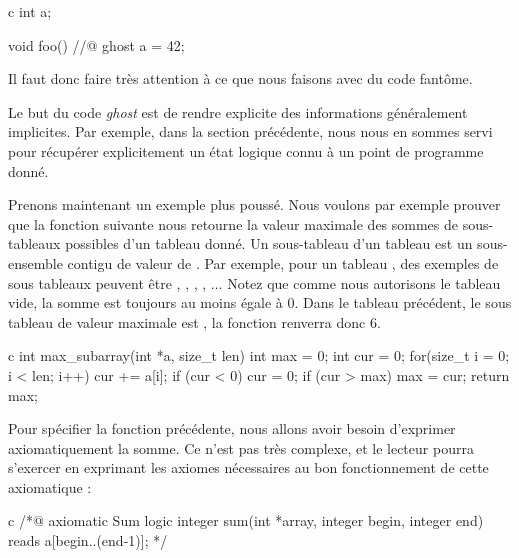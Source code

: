\begin{CodeBlock}{c}
int a;

void foo(){
  //@ ghost a = 42;
}
\end{CodeBlock}



Il faut donc faire très attention à ce que nous faisons avec du code fantôme.





Le but du code \textit{ghost} est de rendre explicite des informations généralement 
implicites. Par exemple, dans la section précédente, nous nous en sommes servi
pour récupérer explicitement un état logique connu à un point de programme 
donné.



Prenons maintenant un exemple plus poussé. Nous voulons par exemple prouver que
la fonction suivante nous retourne la valeur maximale des sommes de sous-tableaux possibles d'un tableau donné. Un sous-tableau d'un tableau  est un
sous-ensemble contigu de valeur de . Par exemple, pour un tableau ,
des exemples de sous tableaux peuvent être \CodeInline{\{\}}, , 
, , ... Notez que comme nous autorisons le tableau vide,
la somme est toujours au moins égale à 0. Dans le tableau précédent, le sous 
tableau de valeur maximale est , la fonction renverra donc 6.



\begin{CodeBlock}{c}
int max_subarray(int *a, size_t len) {
  int max = 0;
  int cur = 0;
  for(size_t i = 0; i < len; i++) {
    cur += a[i];
    if (cur < 0)   cur = 0;
    if (cur > max) max = cur;
  }
  return max;
}
\end{CodeBlock}



Pour spécifier la fonction précédente, nous allons avoir besoin d'exprimer 
axiomatiquement la somme. Ce n'est pas très complexe, et le lecteur pourra
s'exercer en exprimant les axiomes nécessaires au bon fonctionnement de cette 
axiomatique :



\begin{CodeBlock}{c}
/*@ axiomatic Sum {
  logic integer sum(int *array, integer begin, integer end) reads a[begin..(end-1)];
}*/
\end{CodeBlock}



